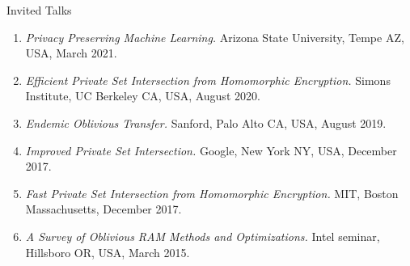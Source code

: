 \documentclass{resume} %
\begin{document}

\begin{rSection}{Invited Talks}
		
	\begin{enumerate}[label=T\arabic* --]
		
		\item \emph{Privacy Preserving Machine Learning.} Arizona State University, Tempe AZ, USA, March 2021.
		
		\item \emph{Efficient Private Set Intersection from Homomorphic Encryption.} Simons Institute, UC Berkeley CA, USA, August 2020.
		
		\item \emph{Endemic Oblivious Transfer.} Sanford, Palo Alto CA, USA, August 2019.
		
		\item \emph{Improved Private Set Intersection.} Google, New York NY, USA, December 2017.
		
		\item  \emph{Fast Private Set Intersection from Homomorphic Encryption.} MIT, Boston Massachusetts, December 2017.
		
		\item \emph{A Survey of Oblivious RAM Methods and Optimizations.} Intel seminar, Hillsboro OR, USA, March 2015.
		
	\end{enumerate}
	
\end{rSection}


\end{document}
